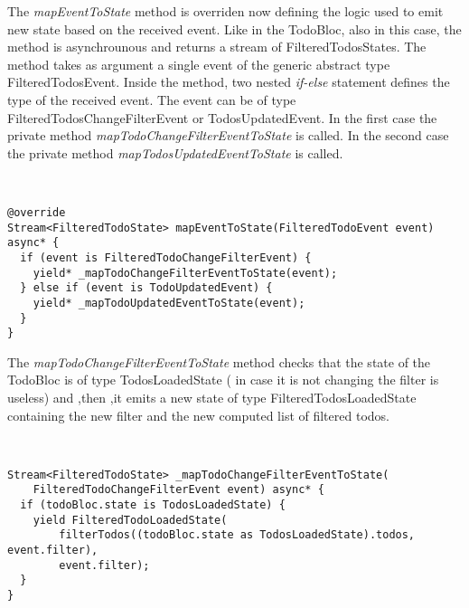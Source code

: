 The \textit{mapEventToState }method is overriden now defining the logic used to emit new state based on the received event. Like in the TodoBloc, also in this case, the method is asynchrounous and returns a stream of FilteredTodosStates. The method takes as argument a single event of the generic abstract type FilteredTodosEvent. Inside the method, two nested \textit{if-else} statement defines the type of the received event. The event can be of type FilteredTodosChangeFilterEvent or TodosUpdatedEvent. In the first case the private method \textit{mapTodoChangeFilterEventToState} is called. In the second case the private method \textit{mapTodosUpdatedEventToState} is called. 
\begin{code}
\mbox{}\\
 \mbox{}
\label{code:2.14}
\begin{verbatim}
@override
Stream<FilteredTodoState> mapEventToState(FilteredTodoEvent event) async* {
  if (event is FilteredTodoChangeFilterEvent) {
    yield* _mapTodoChangeFilterEventToState(event);
  } else if (event is TodoUpdatedEvent) {
    yield* _mapTodoUpdatedEventToState(event);
  }
}
\end{verbatim}
\mbox{}
\end{code}

The \textit{mapTodoChangeFilterEventToState} method  checks that the state of the TodoBloc is of type TodosLoadedState ( in case it is not changing the filter is useless) and ,then ,it emits a new state of type FilteredTodosLoadedState containing the new filter and the new computed list of filtered todos.

\begin{code}
\mbox{}\\
 \mbox{}
\label{code:2.14}
\begin{verbatim}
Stream<FilteredTodoState> _mapTodoChangeFilterEventToState(
    FilteredTodoChangeFilterEvent event) async* {
  if (todoBloc.state is TodosLoadedState) {
    yield FilteredTodoLoadedState(
        filterTodos((todoBloc.state as TodosLoadedState).todos, event.filter),
        event.filter);
  }
}
\end{verbatim}
\mbox{}
\end{code}


